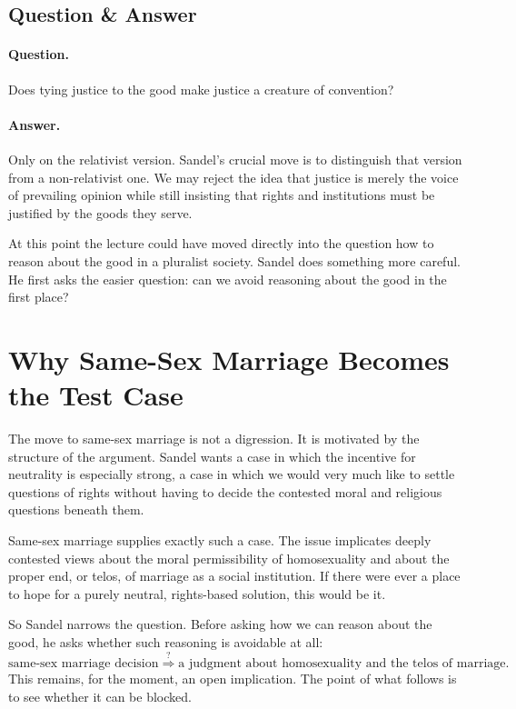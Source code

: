 \subsection{Question \& Answer}

\paragraph{Question.} Does tying justice to the good make justice a creature of convention?

\paragraph{Answer.} Only on the relativist version. Sandel's crucial move is to distinguish that version from a non-relativist one. We may reject the idea that justice is merely the voice of prevailing opinion while still insisting that rights and institutions must be justified by the goods they serve.

At this point the lecture could have moved directly into the question how to reason about the good in a pluralist society. Sandel does something more careful. He first asks the easier question: can we avoid reasoning about the good in the first place?

\section{Why Same-Sex Marriage Becomes the Test Case}

The move to same-sex marriage is not a digression. It is motivated by the structure of the argument. Sandel wants a case in which the incentive for neutrality is especially strong, a case in which we would very much like to settle questions of rights without having to decide the contested moral and religious questions beneath them.

Same-sex marriage supplies exactly such a case. The issue implicates deeply contested views about the moral permissibility of homosexuality and about the proper end, or telos, of marriage as a social institution. If there were ever a place to hope for a purely neutral, rights-based solution, this would be it.

So Sandel narrows the question. Before asking how we can reason about the good, he asks whether such reasoning is avoidable at all:
\begin{equation}
\text{same-sex marriage decision}
\stackrel{?}{\Longrightarrow}
\text{a judgment about homosexuality and the telos of marriage}.
\end{equation}
This remains, for the moment, an open implication. The point of what follows is to see whether it can be blocked.

